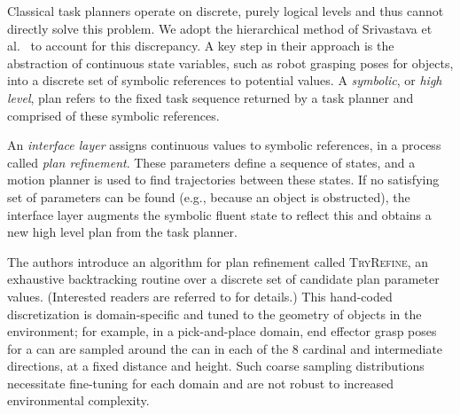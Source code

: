 
Classical task planners operate on discrete, purely logical levels and thus cannot directly
solve this problem. We adopt the hierarchical method of Srivastava et al.~\cite{srivastava2014combined}
to account for this discrepancy. A key step in their approach is the
abstraction of continuous state variables, such as robot grasping poses for objects, into a
discrete set of symbolic references to potential values. A \emph{symbolic}, or \emph{high level}, plan
refers to the fixed task sequence returned by a task planner and comprised of these symbolic references.

An \emph{interface layer} assigns continuous values to symbolic references, in a process called \emph{plan refinement}.
These parameters define a sequence of states, and a motion planner is used to find trajectories between these states.
If no satisfying set of parameters can be found (e.g., because an object is obstructed), the interface layer
augments the symbolic fluent state to reflect this and obtains a new high level plan from the task planner.

The authors introduce an algorithm for plan refinement
called \textsc{TryRefine}, an exhaustive backtracking routine over a discrete set of candidate
plan parameter values. (Interested readers are referred to \cite{srivastava2014combined} for details.)
This hand-coded discretization is domain-specific and tuned to the geometry of objects in the
environment; for example, in a pick-and-place domain, end effector grasp poses for a can are
sampled around the can in each of the 8 cardinal and intermediate directions, at a fixed distance and height.
Such coarse sampling distributions necessitate fine-tuning for each domain and are not robust to
increased environmental complexity.

